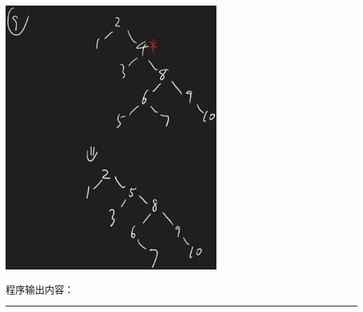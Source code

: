 \documentclass[UTF8]{ctexart}
\begin{document}
\includegraphics[width=0.6\textwidth]{5.png}

程序输出内容：

\noindent\rule{\textwidth}{1pt}
\end{document}
